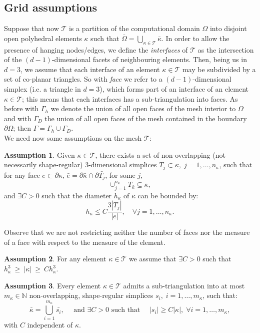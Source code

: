 \documentclass[12pt, a4paper]{article}
\theoremstyle{definition}
\newtheorem{ipotesi}{Assumption}
\theoremstyle{plain}
\theoremstyle{plain}
\begin{document}
\subsection{Grid assumptions}
Suppose that now $\mathcal{T}$ is a partition of the computational domain $\Omega$ into disjoint open polyhedral elements $\kappa$ such that $\bar{\Omega} = \bigcup_{\kappa \in \mathcal{T}} \bar{\kappa}$. In order to allow the presence of hanging nodes/edges, we define the \textit{interfaces} of $\mathcal{T}$  as the intersection of the $(d-1)$-dimensional facets of neighbouring elements. Then, being us in $d=3$, we assume that each interface of an element $\kappa \in \mathcal{T}$ may be subdivided by a set of co-planar triangles. So with \textit{face} we refer to a $(d-1)$-dimensional simplex (i.e. a triangle in $d=3$), which forms part of an interface of an element $\kappa \in \mathcal{T}$; this means that each interfaces has a sub-triangulation into faces. As before with $\Gamma_h$ we denote the union of all open faces of the mesh interior to $\Omega$ and with $\Gamma_D$ the union of all open faces of the mesh contained in the boundary $\partial \Omega$; then $\Gamma = \Gamma_h \cup \Gamma_D$.\\
We need now some assumptions on the mesh $\mathcal{T}$:
\begin{ipotesi} \label{ipo:ipo1}
	Given $\kappa \in \mathcal{T}$, there exists a set of non-overlapping (not necessarily shape-regular) $3$-dimensional simplices $T_j \subset \kappa, \; j = 1,\dots, n_\kappa$, such that for any face $e \subset \partial \kappa$, $\bar{e} = \partial \bar{\kappa} \cap \partial \bar{T_j}$, for some $j$,
	\begin{equation*}
		\cup_{j = 1}^{n_\kappa} \bar{T_k} \subseteq \bar{\kappa},
	\end{equation*}
	and  $\exists C > 0$ such that the diameter $h_\kappa$ of $\kappa$ can be bounded by:
	\begin{equation*}
		h_\kappa \leq C \frac{3 |T_j|}{|e|}, \quad \forall j = 1,\dots,n_\kappa.
	\end{equation*}
\end{ipotesi}
Observe that we are not restricting neither the number of faces nor the measure of a face with respect to the measure of the element.
\begin{ipotesi} \label{ipo:ipo2}
	For any element $\kappa \in \mathcal{T}$ we assume that $\exists C > 0$ such that $h^3_\kappa~\geq~|\kappa|~\geq~Ch^3_\kappa$.
\end{ipotesi}
\begin{ipotesi} \label{ipo:ipo3}
	Every element $\kappa \in \mathcal{T}$ admits a sub-triangulation into at most $m_\kappa \in \mathbb{N}$ non-overlapping, shape-regular simplices $\mathit{s}_i, \; i = 1,\dots,m_\kappa$, such that:
	\begin{equation*}
		\bar{\kappa} = \bigcup\limits_{i = 1}^{m_\kappa} \bar{\mathit{s}_i}, \quad \text{ and } \exists C>0 \text{ such that }  \quad |\mathit{s}_i| \geq C |\kappa|, \; \forall i = 1,\dots,m_\kappa,
	\end{equation*}
	with $C$ independent of $\kappa$.
\end{ipotesi}
\end{document}
